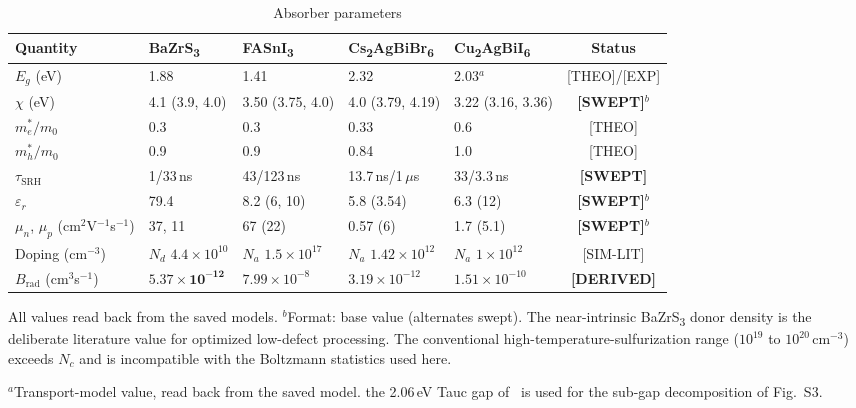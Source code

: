 \documentclass[lettersize,journal,onecolumn]{IEEEtran}
\newcommand{\FASnI}{FASnI\textsubscript{3}}
\newcommand{\CABI}{Cu\textsubscript{2}AgBiI\textsubscript{6}}
\newcommand{\BZS}{BaZrS\textsubscript{3}}
\newcommand{\CABB}{Cs\textsubscript{2}AgBiBr\textsubscript{6}}
\begin{document}
\begin{table}[!ht]
\caption{Absorber parameters}
\centering\small
\begin{tabular}{lllllc}
\toprule
Quantity & \BZS & \FASnI & \CABB & \CABI & Status \\
\midrule
$E_g$ (eV)        & 1.88 & 1.41 & 2.32 & 2.03$^{a}$ & [THEO]/[EXP] \\
$\chi$ (eV)       & 4.1 (3.9, 4.0) & 3.50 (3.75, 4.0) & 4.0 (3.79, 4.19) & 3.22 (3.16, 3.36) & \textbf{[SWEPT]}$^{b}$ \\
$m_e^*/m_0$       & 0.3  & 0.3  & 0.33 & 0.6  & [THEO] \\
$m_h^*/m_0$       & 0.9  & 0.9  & 0.84 & 1.0  & [THEO] \\
$\tau_\mathrm{SRH}$ & 1/33\,ns & 43/123\,ns & 13.7\,ns/1\,$\mu$s & 33/3.3\,ns & \textbf{[SWEPT]} \\
$\varepsilon_r$   & 79.4 & 8.2 (6, 10) & 5.8 (3.54) & 6.3 (12) & \textbf{[SWEPT]}$^{b}$ \\
$\mu_n$, $\mu_p$ (cm$^2$V$^{-1}$s$^{-1}$) & 37, 11 & 67 (22) & 0.57 (6) & 1.7 (5.1) & \textbf{[SWEPT]}$^{b}$ \\
Doping (cm$^{-3}$) & $N_d$ $4.4{\times}10^{10}$ & $N_a$ $1.5{\times}10^{17}$ & $N_a$ $1.42{\times}10^{12}$ & $N_a$ $1{\times}10^{12}$ & [SIM-LIT] \\
$B_\mathrm{rad}$ (cm$^3$s$^{-1}$) & $\mathbf{5.37{\times}10^{-12}}$ & $7.99{\times}10^{-8}$ & $3.19{\times}10^{-12}$ & $1.51{\times}10^{-10}$ & \textbf{[DERIVED]} \\
\bottomrule
\end{tabular}

\vspace{2pt}
{\footnotesize All values read back from the saved models. $^{b}$Format:
base value (alternates swept). The near-intrinsic \BZS{} donor density is
the deliberate literature value for optimized low-defect processing. The
conventional high-temperature-sulfurization range ($10^{19}$ to $10^{20}\,
\mathrm{cm^{-3}}$) exceeds $N_c$ and is incompatible with the Boltzmann
statistics used here.}

\vspace{2pt}
{\footnotesize $^{a}$Transport-model value, read back from the saved model.
the 2.06\,eV Tauc gap of~\cite{sansom2021} is used for the sub-gap
decomposition of Fig.~S3.}
\end{table}
\end{document}
